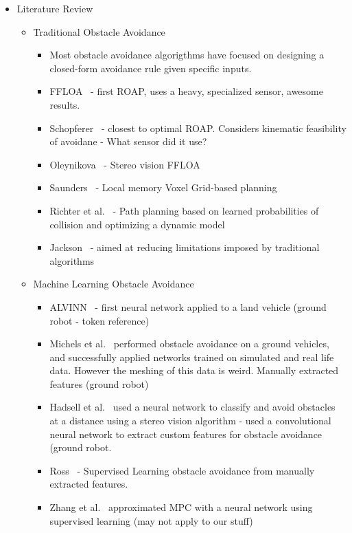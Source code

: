 \documentclass[paper=a4, fontsize=11pt]{scrartcl} %
\begin{document}
	\begin{itemize}
		\item Literature Review
		\begin{itemize}
			\item Traditional Obstacle Avoidance
			\begin{itemize}
				\item Most obstacle avoidance algorigthms have focused on designing a closed-form avoidance rule given specific inputs.
				\item FFLOA~\cite{Scherer2007} - first ROAP, uses a heavy, specialized sensor, awesome results.
				\item Schopferer~\cite{Schopferer2014} - closest to optimal ROAP.  Considers kinematic feasibility of avoidane - What sensor did it use?
				\item Oleynikova~\cite{Oleynikova2015} - Stereo vision FFLOA
				\item Saunders~\cite{Saunders2009} - Local memory Voxel Grid-based planning
				\item Richter et al.~\cite{Richter2014} - Path planning based on learned probabilities of collision and optimizing a dynamic model
				\item Jackson~\cite{CEPA} - aimed at reducing limitations imposed by traditional algorithms
			\end{itemize}
			\item Machine Learning Obstacle Avoidance
			\begin{itemize}			
				\item ALVINN~\cite{Pomerleau1989} - first neural network applied to a land vehicle (ground robot - token reference)
				\item Michels et al.~\cite{Michels2005} performed obstacle avoidance on a ground vehicles, and successfully applied networks trained on simulated and real life data.  However the meshing of this data is weird.  Manually extracted features (ground robot)
				\item Hadsell et al.~\cite{Hadsell2009} used a neural network to classify and avoid obstacles at a distance using a stereo vision algorithm - used a convolutional neural network to extract custom features for obstacle avoidance (ground robot.
				\item Ross~\cite{Ross2013} - Supervised Learning obstacle avoidance from manually extracted features.
				\item Zhang et al.~\cite{Zhang2015} approximated MPC with a neural network using supervised learning (may not apply to our stuff)

\end{itemize}
\end{itemize}
\end{itemize}
\end{document}
